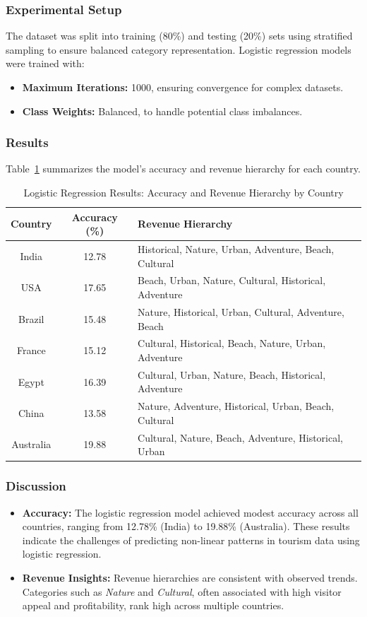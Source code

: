 \documentclass{article}
\begin{document}
\subsubsection{Experimental Setup}
The dataset was split into training (80\%) and testing (20\%) sets using stratified sampling to ensure balanced category representation. Logistic regression models were trained with:
\begin{itemize}
    \item \textbf{Maximum Iterations:} 1000, ensuring convergence for complex datasets.
    \item \textbf{Class Weights:} Balanced, to handle potential class imbalances.
\end{itemize}

\subsubsection{Results}
Table~\ref{tab:logistic_regression_summary} summarizes the model's accuracy and revenue hierarchy for each country.

\begin{table}[H]
\centering
\begin{tabular}{|c|c|l|}
\hline
\textbf{Country} & \textbf{Accuracy (\%)} & \textbf{Revenue Hierarchy} \\ \hline
India & 12.78 & Historical, Nature, Urban, Adventure, Beach, Cultural \\
USA & 17.65 & Beach, Urban, Nature, Cultural, Historical, Adventure \\
Brazil & 15.48 & Nature, Historical, Urban, Cultural, Adventure, Beach \\
France & 15.12 & Cultural, Historical, Beach, Nature, Urban, Adventure \\
Egypt & 16.39 & Cultural, Urban, Nature, Beach, Historical, Adventure \\
China & 13.58 & Nature, Adventure, Historical, Urban, Beach, Cultural \\
Australia & 19.88 & Cultural, Nature, Beach, Adventure, Historical, Urban \\ \hline
\end{tabular}
\caption{Logistic Regression Results: Accuracy and Revenue Hierarchy by Country}
\label{tab:logistic_regression_summary}
\end{table}

\subsubsection{Discussion}
\begin{itemize}
    \item \textbf{Accuracy:} The logistic regression model achieved modest accuracy across all countries, ranging from 12.78\% (India) to 19.88\% (Australia). These results indicate the challenges of predicting non-linear patterns in tourism data using logistic regression.
    \item \textbf{Revenue Insights:} Revenue hierarchies are consistent with observed trends. Categories such as \textit{Nature} and \textit{Cultural}, often associated with high visitor appeal and profitability, rank high across multiple countries.
\end{itemize}
\end{document}
